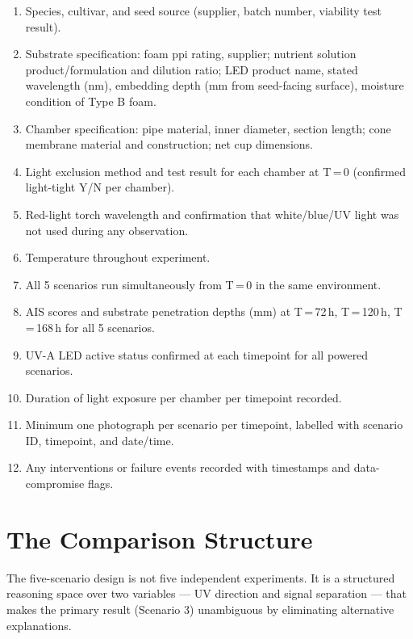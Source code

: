 \documentclass[10pt, a4paper]{article}
\begin{document}
\begin{enumerate}[itemsep=0.2em]
  \item Species, cultivar, and seed source (supplier,
    batch number, viability test result).
  \item Substrate specification: foam ppi rating, supplier;
    nutrient solution product/formulation and dilution
    ratio; LED product name, stated wavelength (nm),
    embedding depth (mm from seed-facing surface),
    moisture condition of Type B foam.
  \item Chamber specification: pipe material, inner
    diameter, section length; cone membrane material
    and construction; net cup dimensions.
  \item Light exclusion method and test result for each
    chamber at T\,=\,0 (confirmed light-tight Y/N per
    chamber).
  \item Red-light torch wavelength and confirmation that
    white/blue/UV light was not used during any
    observation.
  \item Temperature throughout experiment.
  \item All 5 scenarios run simultaneously from T\,=\,0
    in the same environment.
  \item AIS scores and substrate penetration depths (mm)
    at T\,=\,72\,h, T\,=\,120\,h, T\,=\,168\,h
    for all 5 scenarios.
  \item UV-A LED active status confirmed at each
    timepoint for all powered scenarios.
  \item Duration of light exposure per chamber per
    timepoint recorded.
  \item Minimum one photograph per scenario per
    timepoint, labelled with scenario ID, timepoint,
    and date/time.
  \item Any interventions or failure events recorded
    with timestamps and data-compromise flags.
\end{enumerate}

\vspace{0.5em}

\section{The Comparison Structure}

The five-scenario design is not five independent
experiments. It is a structured reasoning space over
two variables --- UV direction and signal separation ---
that makes the primary result (Scenario 3) unambiguous
by eliminating alternative explanations.
\end{document}

